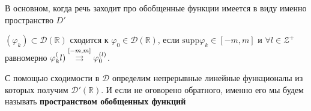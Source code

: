 В основном, когда речь заходит про обобщенные функции имеется в виду именно пространство $D'$
\begin{to_def}
	$(\varphi_k) \subset \mathcal{D}(\mathbb{R})$ сходится к $\varphi_0 \in \mathcal{D}(\mathbb{R})$, если $\text{supp} \varphi_k \in [-m, m]$ и $\forall l \in \mathcal{Z}^+$ равномерно $\varphi_k^(l) \overset{[-m, m]}{\rightrightarrows} \varphi_0^{(l)}$.
\end{to_def}

С помощью сходимости в $\mathcal{D}$ определим непрерывные линейные функционалы из которых получим $\mathcal{D}'(\mathbb{R})$. И если не оговорено обратного, именно его мы будем называть \textbf{пространством обобщенных функций} 